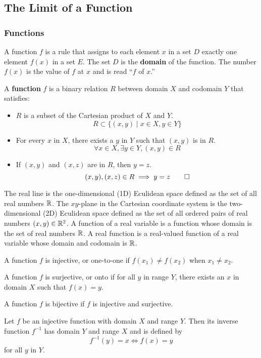 \subsection{The Limit of a Function}

\subsubsection*{Functions}  
A function \(f\) is a rule that assigns to each element \(x\) in a set \(D\)
exactly one element \(f(x)\) in a set \(E\).
The set \(D\) is the \textbf{domain} of the function.
The number \(f(x)\) is the value of \(f\) at \(x\) and is read ``\(f\) of \(x\).''
\begin{definition}
    A \textbf{function} \(f\) is a binary relation \(R\) between domain \(X\)
    and codomain \(Y\) that satisfies:
    \begin{itemize}
        \item \(R\) is a subset of the Cartesian product of \(X\) and \(Y\).
        \[R\subset\{(x,y)\mid x\in X,y\in Y\}\]
        \item For every \(x\) in \(X\), there exists a \(y\) in \(Y\) such
        that \((x,y)\) is in \(R\).
        \[\forall x\in X,\exists y\in Y,(x,y)\in R\]
        \item If \((x,y)\) and \((x,z)\) are in \(R\), then \(y=z\).
        \[(x,y),(x,z)\in R\implies y=z\qedhere\]
    \end{itemize}
\end{definition}
The real line is the one-dimensional (1D) Eculidean space defined as the set
of all real numbers \(\mathbb{R}\).
The \(xy\)-plane in the Cartesian coordinate system is the two-dimensional
(2D) Eculidean space defined as the set of all ordered pairs of real numbers
\((x,y)\in\mathbb{R}^2\).
A function of a real variable is a function whose domain is the set of real
numbers \(\mathbb{R}\).
A real function is a real-valued function of a real variable whose domain and
codomain is \(\mathbb{R}\).
\begin{definition}
    A function \(f\) is injective, or one-to-one if \(f(x_1)\neq f(x_2)\) when
    \(x_1\neq x_2\).
\end{definition}
\begin{definition}
    A function \(f\) is surjective, or onto if for all \(y\) in range \(Y\),
    there exists an \(x\) in domain \(X\) such that \(f(x)=y\).
\end{definition}
\begin{definition}
    A function \(f\) is bijective if \(f\) is injective and surjective.
\end{definition}
\begin{definition}
    Let \(f\) be an injective function with domain \(X\) and range \(Y\).
    Then its inverse function \(f^{-1}\) has domain \(Y\) and range \(X\) and
    is defined by
    \[f^{-1}(y)=x\iff f(x)=y\]
    for all \(y\) in \(Y\).
\end{definition}

